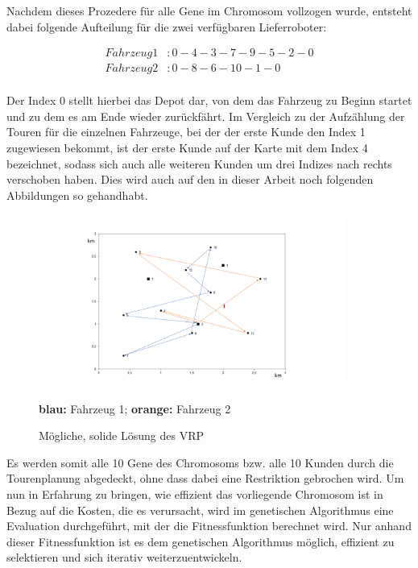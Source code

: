 \documentclass[a4paper,12pt,parskip,bibtotoc,liststotoc]{article}
\begin{document}
Nachdem dieses Prozedere für alle Gene im Chromosom vollzogen wurde, entsteht dabei folgende Aufteilung für die zwei verfügbaren Lieferroboter: 


\begin{equation} \label{eq:test}
    \begin{aligned} 
         Fahrzeug 1&: 0 - 4 - 3 - 7 - 9 - 5 - 2 - 0 \\
        Fahrzeug 2&: 0 - 8 - 6 - 10 - 1 - 0\\
    \end{aligned}
\end{equation}




Der Index 0 stellt hierbei das Depot dar, von dem das Fahrzeug zu Beginn startet und zu dem es am Ende wieder zurückfährt. Im Vergleich zu der Aufzählung der Touren für die einzelnen Fahrzeuge, bei der der erste Kunde den Index 1 zugewiesen bekommt, ist der erste Kunde auf der Karte mit dem Index 4 bezeichnet, sodass sich auch alle weiteren Kunden um drei Indizes nach rechts verschoben haben. 
Dies wird auch auf den in dieser Arbeit noch folgenden Abbildungen so gehandhabt.




\begin{figure}[h!]
  \begin{center}
    \includegraphics[width=100mm]{vrp11.png}
    \caption{Mögliche, solide Lösung des VRP}  \label{Typen}
    {\footnotesize \textbf{blau:} Fahrzeug 1;  \textbf{orange:} Fahrzeug 2}
  \end{center}
\end{figure}

Es werden somit alle 10 Gene des Chromosoms bzw. alle 10 Kunden durch die Tourenplanung abgedeckt, ohne dass dabei eine Restriktion gebrochen wird.
Um nun in Erfahrung zu bringen, wie effizient das vorliegende Chromosom ist in Bezug auf die Kosten, die es verursacht, wird im genetischen Algorithmus eine Evaluation durchgeführt, mit der die Fitnessfunktion berechnet wird. 
Nur anhand dieser Fitnessfunktion ist es dem genetischen Algorithmus möglich, effizient zu selektieren und sich iterativ weiterzuentwickeln.
\end{document}
